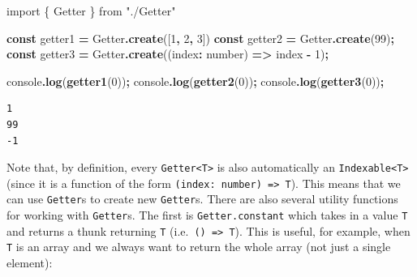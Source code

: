 \documentclass[
  openany]{book}
\newenvironment{Shaded}{\begin{snugshade}}{\end{snugshade}}
\newcommand{\BuiltInTok}[1]{#1}
\newcommand{\DataTypeTok}[1]{\textcolor[rgb]{0.13,0.29,0.53}{#1}}
\newcommand{\DecValTok}[1]{\textcolor[rgb]{0.00,0.00,0.81}{#1}}
\newcommand{\FunctionTok}[1]{\textcolor[rgb]{0.13,0.29,0.53}{\textbf{#1}}}
\newcommand{\ImportTok}[1]{#1}
\newcommand{\KeywordTok}[1]{\textcolor[rgb]{0.13,0.29,0.53}{\textbf{#1}}}
\newcommand{\NormalTok}[1]{#1}
\newcommand{\OperatorTok}[1]{\textcolor[rgb]{0.81,0.36,0.00}{\textbf{#1}}}
\newcommand{\StringTok}[1]{\textcolor[rgb]{0.31,0.60,0.02}{#1}}
\theoremstyle{definition}
\theoremstyle{definition}
\theoremstyle{definition}
\theoremstyle{definition}
\theoremstyle{remark}
\begin{document}
\begin{Shaded}
\begin{Highlighting}[]
\ImportTok{import}\NormalTok{ \{ Getter \} }\ImportTok{from} \StringTok{"./Getter"}

\KeywordTok{const}\NormalTok{ getter1 }\OperatorTok{=}\NormalTok{ Getter}\OperatorTok{.}\FunctionTok{create}\NormalTok{([}\DecValTok{1}\OperatorTok{,} \DecValTok{2}\OperatorTok{,} \DecValTok{3}\NormalTok{])}
\KeywordTok{const}\NormalTok{ getter2 }\OperatorTok{=}\NormalTok{ Getter}\OperatorTok{.}\FunctionTok{create}\NormalTok{(}\DecValTok{99}\NormalTok{)}\OperatorTok{;}
\KeywordTok{const}\NormalTok{ getter3 }\OperatorTok{=}\NormalTok{ Getter}\OperatorTok{.}\FunctionTok{create}\NormalTok{((index}\OperatorTok{:} \DataTypeTok{number}\NormalTok{) }\KeywordTok{=\textgreater{}}\NormalTok{ index }\OperatorTok{{-}} \DecValTok{1}\NormalTok{)}\OperatorTok{;}

\BuiltInTok{console}\OperatorTok{.}\FunctionTok{log}\NormalTok{(}\FunctionTok{getter1}\NormalTok{(}\DecValTok{0}\NormalTok{))}\OperatorTok{;}
\BuiltInTok{console}\OperatorTok{.}\FunctionTok{log}\NormalTok{(}\FunctionTok{getter2}\NormalTok{(}\DecValTok{0}\NormalTok{))}\OperatorTok{;}
\BuiltInTok{console}\OperatorTok{.}\FunctionTok{log}\NormalTok{(}\FunctionTok{getter3}\NormalTok{(}\DecValTok{0}\NormalTok{))}\OperatorTok{;}
\end{Highlighting}
\end{Shaded}

\begin{verbatim}
1
99
-1
\end{verbatim}

Note that, by definition, every \texttt{Getter\textless{}T\textgreater{}} is also automatically an \texttt{Indexable\textless{}T\textgreater{}} (since it is a function of the form \texttt{(index:\ number)\ =\textgreater{}\ T}). This means that we can use \texttt{Getter}s to create new \texttt{Getter}s. There are also several utility functions for working with \texttt{Getter}s. The first is \texttt{Getter.constant} which takes in a value \texttt{T} and returns a thunk returning \texttt{T} (i.e.~\texttt{()\ =\textgreater{}\ T}). This is useful, for example, when \texttt{T} is an array and we always want to return the whole array (not just a single element):
\end{document}
